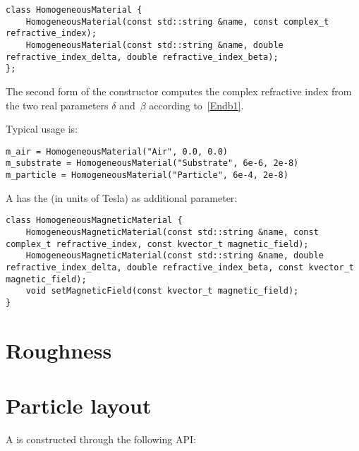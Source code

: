 \setCpp
\begin{lstlisting}
class HomogeneousMaterial {
    HomogeneousMaterial(const std::string &name, const complex_t refractive_index);
    HomogeneousMaterial(const std::string &name, double refractive_index_delta, double refractive_index_beta);
};
\end{lstlisting}

The second form of the constructor computes the complex refractive index
%
from the two real parameters $\delta$ and~$\beta$ according to~\cref{Endb1}.

Typical usage is:

\setPy
\begin{lstlisting}
m_air = HomogeneousMaterial("Air", 0.0, 0.0)
m_substrate = HomogeneousMaterial("Substrate", 6e-6, 2e-8)
m_particle = HomogeneousMaterial("Particle", 6e-4, 2e-8)
\end{lstlisting}

A  has the  (in units of Tesla)
%
as additional parameter:

\setCpp
\begin{lstlisting}
class HomogeneousMagneticMaterial {
    HomogeneousMagneticMaterial(const std::string &name, const complex_t refractive_index, const kvector_t magnetic_field);
    HomogeneousMagneticMaterial(const std::string &name, double refractive_index_delta, double refractive_index_beta, const kvector_t magnetic_field);
    void setMagneticField(const kvector_t magnetic_field);
}
\end{lstlisting}

\section{Roughness}\label{SRefRough}

\MissingSection

\section{Particle layout}\label{SRefPLay}

A  is constructed through the following API:

